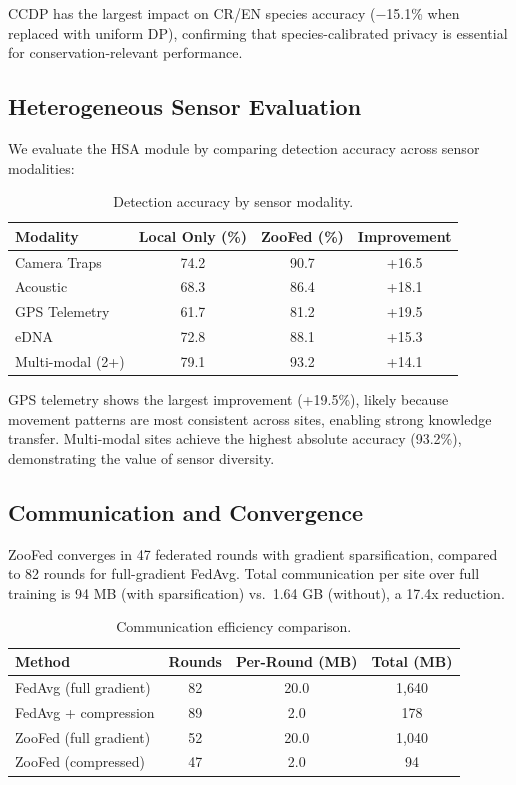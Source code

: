 \documentclass[11pt,a4paper]{article}
\begin{document}
CCDP has the largest impact on CR/EN species accuracy ($-$15.1\% when replaced with uniform DP), confirming that species-calibrated privacy is essential for conservation-relevant performance.

\subsection{Heterogeneous Sensor Evaluation}

We evaluate the HSA module by comparing detection accuracy across sensor modalities:

\begin{table}[H]
\centering
\caption{Detection accuracy by sensor modality.}
\label{tab:sensor_accuracy}
\begin{tabular}{@{}lccc@{}}
\toprule
\textbf{Modality} & \textbf{Local Only (\%)} & \textbf{ZooFed (\%)} & \textbf{Improvement} \\
\midrule
Camera Traps & 74.2 & 90.7 & +16.5 \\
Acoustic & 68.3 & 86.4 & +18.1 \\
GPS Telemetry & 61.7 & 81.2 & +19.5 \\
eDNA & 72.8 & 88.1 & +15.3 \\
Multi-modal (2+) & 79.1 & 93.2 & +14.1 \\
\bottomrule
\end{tabular}
\end{table}

GPS telemetry shows the largest improvement (+19.5\%), likely because movement patterns are most consistent across sites, enabling strong knowledge transfer.
Multi-modal sites achieve the highest absolute accuracy (93.2\%), demonstrating the value of sensor diversity.

\subsection{Communication and Convergence}

ZooFed converges in 47 federated rounds with gradient sparsification, compared to 82 rounds for full-gradient FedAvg.
Total communication per site over full training is 94 MB (with sparsification) vs.\ 1.64 GB (without), a 17.4x reduction.

\begin{table}[H]
\centering
\caption{Communication efficiency comparison.}
\label{tab:communication}
\begin{tabular}{@{}lccc@{}}
\toprule
\textbf{Method} & \textbf{Rounds} & \textbf{Per-Round (MB)} & \textbf{Total (MB)} \\
\midrule
FedAvg (full gradient) & 82 & 20.0 & 1,640 \\
FedAvg + compression & 89 & 2.0 & 178 \\
ZooFed (full gradient) & 52 & 20.0 & 1,040 \\
ZooFed (compressed) & 47 & 2.0 & 94 \\
\bottomrule
\end{tabular}
\end{table}
\end{document}
